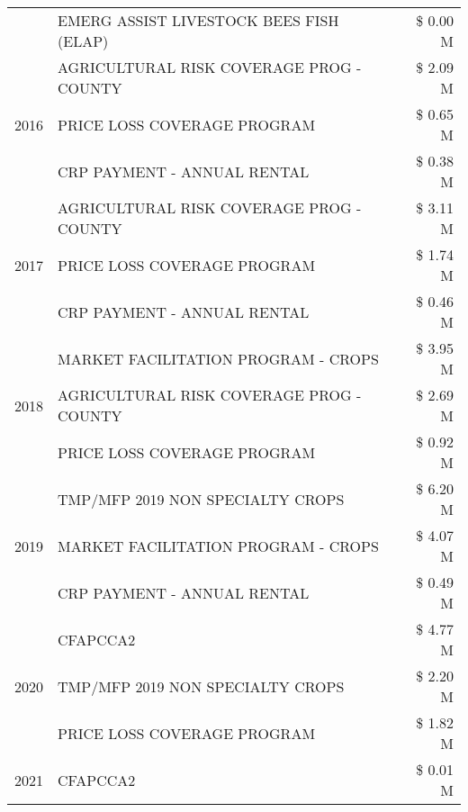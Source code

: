 \begin{tabular}{llr}
 & EMERG ASSIST LIVESTOCK BEES FISH (ELAP) & \$ 0.00 M \\
\cline{1-3}
\multirow[t]{3}{*}{2016} & AGRICULTURAL RISK COVERAGE PROG - COUNTY      & \$ 2.09 M \\
 & PRICE LOSS COVERAGE PROGRAM                   & \$ 0.65 M \\
 & CRP PAYMENT - ANNUAL RENTAL                   & \$ 0.38 M \\
\cline{1-3}
\multirow[t]{3}{*}{2017} & AGRICULTURAL RISK COVERAGE PROG - COUNTY & \$ 3.11 M \\
 & PRICE LOSS COVERAGE PROGRAM & \$ 1.74 M \\
 & CRP PAYMENT - ANNUAL RENTAL & \$ 0.46 M \\
\cline{1-3}
\multirow[t]{3}{*}{2018} & MARKET FACILITATION PROGRAM - CROPS & \$ 3.95 M \\
 & AGRICULTURAL RISK COVERAGE PROG - COUNTY & \$ 2.69 M \\
 & PRICE LOSS COVERAGE PROGRAM & \$ 0.92 M \\
\cline{1-3}
\multirow[t]{3}{*}{2019} & TMP/MFP 2019 NON SPECIALTY CROPS & \$ 6.20 M \\
 & MARKET FACILITATION PROGRAM - CROPS & \$ 4.07 M \\
 & CRP PAYMENT - ANNUAL RENTAL & \$ 0.49 M \\
\cline{1-3}
\multirow[t]{3}{*}{2020} & CFAPCCA2 & \$ 4.77 M \\
 & TMP/MFP 2019 NON SPECIALTY CROPS & \$ 2.20 M \\
 & PRICE LOSS COVERAGE PROGRAM & \$ 1.82 M \\
\cline{1-3}
2021 & CFAPCCA2 & \$ 0.01 M \\
\cline{1-3}
\bottomrule
\end{tabular}
